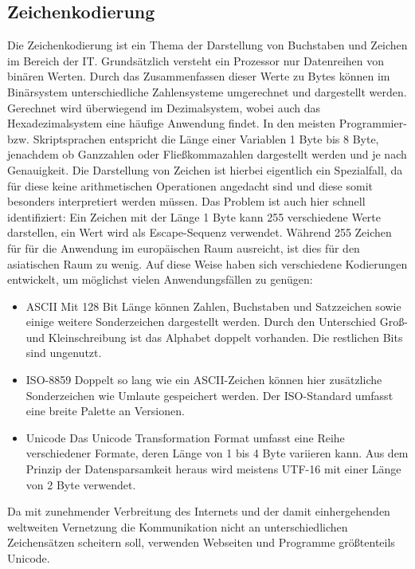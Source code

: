 \subsection{Zeichenkodierung}
Die Zeichenkodierung ist ein Thema der Darstellung von Buchstaben und Zeichen im Bereich der IT. Grundsätzlich versteht ein Prozessor nur Datenreihen von binären Werten. Durch das Zusammenfassen dieser Werte zu Bytes können im Binärsystem unterschiedliche Zahlensysteme umgerechnet und dargestellt werden. Gerechnet wird überwiegend im Dezimalsystem, wobei auch das Hexadezimalsystem eine häufige Anwendung findet. In den meisten Programmier- bzw. Skriptsprachen entspricht die Länge einer Variablen 1 Byte bis 8 Byte, jenachdem ob Ganzzahlen oder Fließkommazahlen dargestellt werden und je nach Genauigkeit. Die Darstellung von Zeichen ist hierbei eigentlich ein Spezialfall, da für diese keine arithmetischen Operationen angedacht sind und diese somit besonders interpretiert werden müssen. Das Problem ist auch hier schnell identifiziert: Ein Zeichen mit der Länge 1 Byte kann 255 verschiedene Werte darstellen, ein Wert wird als Escape-Sequenz verwendet. Während 255 Zeichen für für die Anwendung im europäischen Raum ausreicht, ist dies für den asiatischen Raum zu wenig. Auf diese Weise haben sich verschiedene Kodierungen entwickelt, um möglichst vielen Anwendungsfällen zu genügen:
\begin{itemize}
\item{ASCII} Mit 128 Bit Länge können Zahlen, Buchstaben und Satzzeichen sowie einige weitere Sonderzeichen dargestellt werden. Durch den Unterschied Groß- und Kleinschreibung ist das Alphabet doppelt vorhanden. Die restlichen Bits sind ungenutzt.
\item{ISO-8859} Doppelt so lang wie ein ASCII-Zeichen können hier zusätzliche Sonderzeichen wie Umlaute gespeichert werden. Der ISO-Standard umfasst eine breite Palette an Versionen.
\item{Unicode} Das Unicode Transformation Format umfasst eine Reihe verschiedener Formate, deren Länge von 1 bis 4 Byte variieren kann. Aus dem Prinzip der Datensparsamkeit heraus wird meistens UTF-16 mit einer Länge von 2 Byte verwendet.
\end{itemize}
Da mit zunehmender Verbreitung des Internets und der damit einhergehenden weltweiten Vernetzung die Kommunikation nicht an unterschiedlichen Zeichensätzen scheitern soll, verwenden Webseiten und Programme größtenteils Unicode. 

